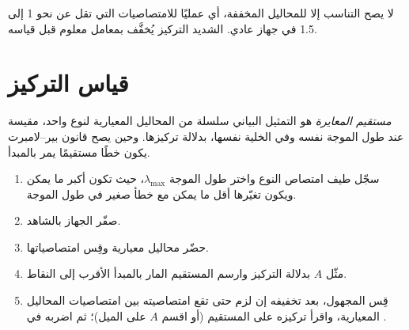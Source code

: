 \begin{remark}\label{rem:g11:absorbance:dilute}
لا يصح التناسب إلا للمحاليل المخففة، أي عمليًا للامتصاصيات التي تقل عن نحو 1
إلى 1.5 في جهاز عادي.  الشديد التركيز يُخفَّف بمعامل معلوم قبل
قياسه.
\end{remark}

\section{قياس التركيز}

\begin{definition}\label{def:g11:absorbance:calibration-line}
\emph{مستقيم المعايرة} هو التمثيل البياني 
سلسلة من المحاليل المعيارية لنوع واحد، مقيسة عند طول الموجة نفسه وفي الخلية
نفسها، بدلالة تركيزها. وحين يصح قانون بير--لامبرت يكون خطًا مستقيمًا يمر
بالمبدأ.
\end{definition}

\begin{method}\label{met:g11:absorbance:calibration}
\begin{enumerate}
  \item سجّل طيف امتصاص النوع واختر طول الموجة
        $\lambda_{\max}$، حيث تكون  أكبر ما يمكن ويكون تغيّرها
        أقل ما يمكن مع خطأ صغير في طول الموجة.
  \item صفّر الجهاز بالشاهد.
  \item حضّر محاليل معيارية   وقِس
        امتصاصياتها.
  \item مثّل $A$ بدلالة التركيز وارسم المستقيم المار بالمبدأ الأقرب إلى
        النقاط.
  \item قِس المجهول، بعد تخفيفه إن لزم حتى تقع امتصاصيته بين امتصاصيات
        المحاليل المعيارية، واقرأ تركيزه على المستقيم (أو اقسم $A$ على
        الميل)؛ ثم اضربه في .
\end{enumerate}
\end{method}

